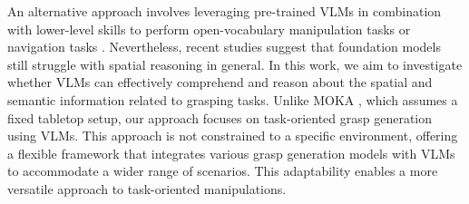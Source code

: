 An alternative approach involves leveraging pre-trained VLMs in combination with lower-level skills to perform open-vocabulary manipulation tasks \cite{weerakoon2024behav, nasiriany2024pivot} or navigation tasks \cite{liu2024moka, wu2024helpful}. Nevertheless, recent studies \cite{ramakrishnan2024does} suggest that foundation models still struggle with spatial reasoning in general. In this work, we aim to investigate whether VLMs can effectively comprehend and reason about the spatial and semantic information related to grasping tasks. Unlike MOKA \cite{liu2024moka}, which assumes a fixed tabletop setup, our approach focuses on task-oriented grasp generation using VLMs. This approach is not constrained to a specific environment, offering a flexible framework that integrates various grasp generation models with VLMs to accommodate a wider range of scenarios. This adaptability enables a more versatile approach to task-oriented manipulations.